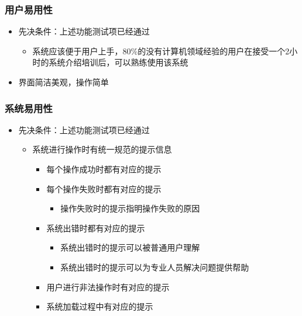 \documentclass[hyperref, a4paper]{ctexart}
\providecommand{\tightlist}{%
  \setlength{\itemsep}{0pt}\setlength{\parskip}{0pt}}
\begin{document}
\hypertarget{ux7528ux6237ux6613ux7528ux6027}{%
\subsubsection{用户易用性}\label{ux7528ux6237ux6613ux7528ux6027}}

\begin{itemize}
\tightlist
\item
  先决条件：上述功能测试项已经通过

  \begin{itemize}
  \tightlist
  \item
    系统应该便于用户上手，80\%的没有计算机领域经验的用户在接受一个2小时的系统介绍培训后，可以熟练使用该系统
  \end{itemize}
\item
  界面简洁美观，操作简单
\end{itemize}

\hypertarget{ux7cfbux7edfux6613ux7528ux6027}{%
\subsubsection{系统易用性}\label{ux7cfbux7edfux6613ux7528ux6027}}

\begin{itemize}
\tightlist
\item
  先决条件：上述功能测试项已经通过

  \begin{itemize}
  \tightlist
  \item
    系统进行操作时有统一规范的提示信息

    \begin{itemize}
    \tightlist
    \item
      每个操作成功时都有对应的提示
    \item
      每个操作失败时都有对应的提示

      \begin{itemize}
      \tightlist
      \item
        操作失败时的提示指明操作失败的原因
      \end{itemize}
    \item
      系统出错时都有对应的提示

      \begin{itemize}
      \tightlist
      \item
        系统出错时的提示可以被普通用户理解
      \item
        系统出错时的提示可以为专业人员解决问题提供帮助
      \end{itemize}
    \item
      用户进行非法操作时有对应的提示
    \item
      系统加载过程中有对应的提示
    \end{itemize}
  \end{itemize}
\end{itemize}
\end{document}
